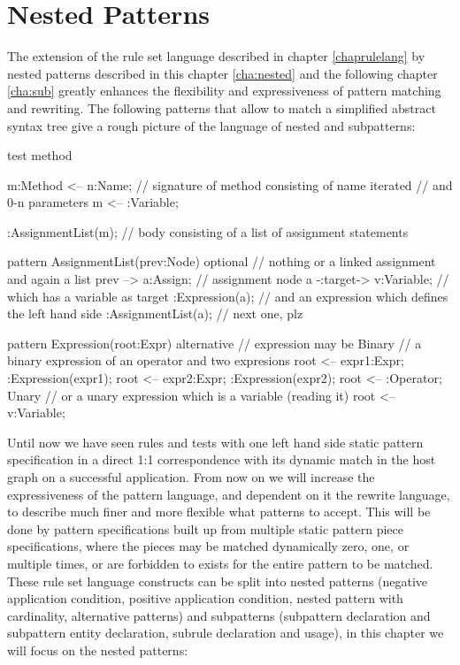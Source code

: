 \chapter{Nested Patterns}
\label{cha:nested}

The extension of the rule set language described in chapter \ref{chaprulelang} by nested patterns described in this chapter \ref{cha:nested} and the following chapter \ref{cha:sub} greatly enhances the flexibility and expressiveness of pattern matching and rewriting.
The following patterns that allow to match a simplified abstract syntax tree give a rough picture of the language of nested and subpatterns:
  \begin{example} \label{ex:proggraph}
    \begin{grgen}
test method
{
  m:Method <-- n:Name; // signature of method consisting of name
  iterated { // and 0-n parameters
    m <-- :Variable;
  }  
  
  :AssignmentList(m); // body consisting of a list of assignment statements
}

pattern AssignmentList(prev:Node)
{
  optional { // nothing or a linked assignment and again a list
    prev --> a:Assign; // assignment node 
    a -:target-> v:Variable; // which has a variable as target 
    :Expression(a);  // and an expression which defines the left hand side 
    :AssignmentList(a); // next one, plz
  }
}

pattern Expression(root:Expr)
{
  alternative { // expression may be
    Binary { // a binary expression of an operator and two expresions
      root <-- expr1:Expr;
      :Expression(expr1);
      root <-- expr2:Expr;
      :Expression(expr2);
      root <-- :Operator;
    }
    Unary { // or a unary expression which is a variable (reading it)
      root <-- v:Variable;
    }
  }
}
    \end{grgen}
  \end{example}\label{introexample}


Until now we have seen rules and tests with one left hand side static pattern specification in a direct 1:1 correspondence with its dynamic match in the host graph on a successful application.
From now on we will increase the expressiveness of the pattern language, and dependent on it the rewrite language, to describe much finer and more flexible what patterns to accept.
This will be done by pattern specifications built up from multiple static pattern piece specifications, where the pieces may be matched dynamically zero, one, or multiple times, or are forbidden to exists for the entire pattern to be matched.
These rule set language constructs can be split into nested patterns (negative application condition, positive application condition, nested pattern with cardinality, alternative patterns) and subpatterns (subpattern declaration and subpattern entity declaration, subrule declaration and usage), in this chapter we will focus on the nested patterns:

